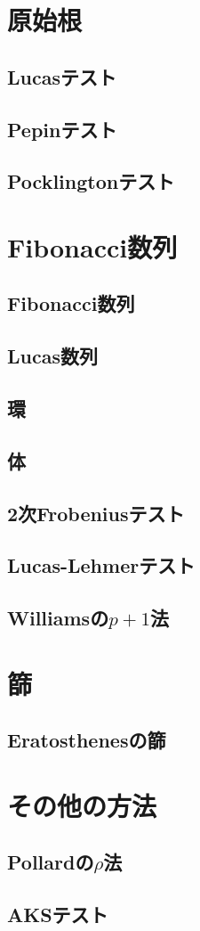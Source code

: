 \section{原始根}
\subsection{Lucasテスト}

\subsection{Pepinテスト}

\subsection{Pocklingtonテスト}


\section{Fibonacci数列}
\subsection{Fibonacci数列}

\subsection{Lucas数列}

\subsection{環}

\subsection{体}

\subsection{2次Frobeniusテスト}

\subsection{Lucas-Lehmerテスト}

\subsection{Williamsの$p+1$法}


\section{篩}
\subsection{Eratosthenesの篩}


\section{その他の方法}
\subsection{Pollardの$\rho$法}

\subsection{AKSテスト}


\newpage
\printindex



